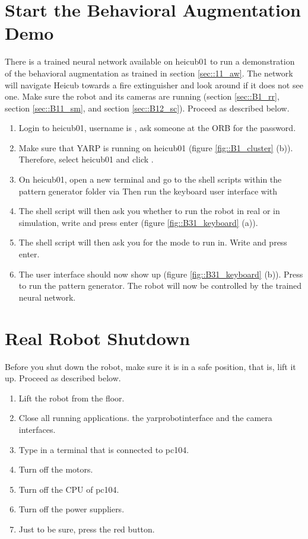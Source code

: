 \section{Start the Behavioral Augmentation Demo}
\label{sec::B4_ba}
There is a trained neural network available on heicub01 to run a demonstration of the behavioral augmentation as trained in section \ref{sec::11_aw}. The network will navigate Heicub towards a fire extinguisher and look around if it does not see one. Make sure the robot and its cameras are running (section \ref{sec::B1_rr}, section \ref{sec::B11_sm}, and section \ref{sec::B12_sc}). Proceed as described below.
\begin{enumerate}
	\item Login to heicub01, username is , ask someone at the ORB for the password.%
	\item Make sure that YARP is running on heicub01 (figure \ref{fig::B1_cluster} (b)). Therefore, select heicub01 and click .
	\item On heicub01, open a new terminal and go to the shell scripts within the pattern generator folder via \newline {}
	\newline Then run the keyboard user interface with
	\newline {}
	\item The shell script will then ask you whether to run the robot in real or in simulation, write  and press enter (figure \ref{fig::B31_keyboard} (a)).
	\item The shell script will then ask you for the mode to run in. Write  and press enter.
	\item The user interface should now show up (figure \ref{fig::B31_keyboard} (b)). Press  to run the pattern generator. The robot will now be controlled by the trained neural network.
\end{enumerate}
\FloatBarrier
\section{Real Robot Shutdown}
Before you shut down the robot, make sure it is in a safe position, that is, lift it up. Proceed as described below.
\begin{enumerate}
	\item Lift the robot from the floor.
	\item Close all running applications.  the yarprobotinterface and the camera interfaces.
	\item Type  in a terminal that is connected to pc104.
	\item Turn off the motors.
	\item Turn off the CPU of pc104.
	\item Turn off the power suppliers.
	\item Just to be sure, press the red button.
\end{enumerate}